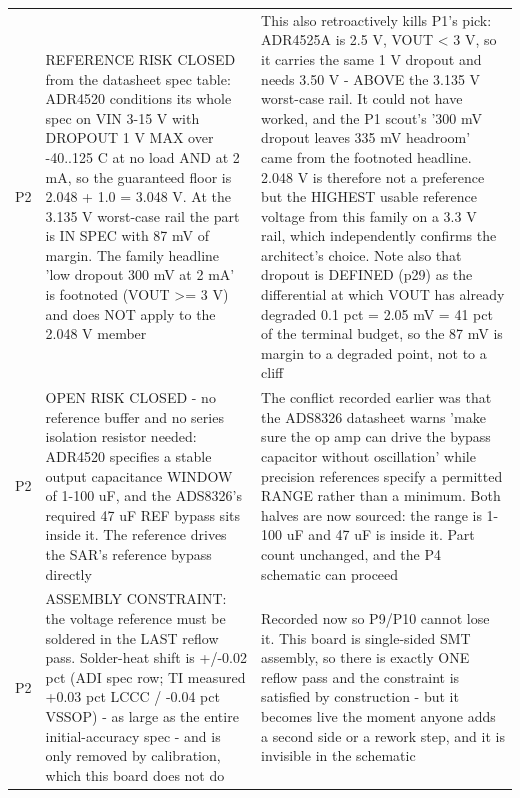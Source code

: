 \documentclass[11pt,a4paper]{article}
\begin{document}
{\begin{longtable}{lp{5.2cm}p{7.2cm}}
P2 & REFERENCE RISK CLOSED from the datasheet spec table: ADR4520 conditions its whole spec on VIN 3-15 V with DROPOUT 1 V MAX over -40..125 C at no load AND at 2 mA, so the guaranteed floor is 2.048 + 1.0 = 3.048 V. At the 3.135 V worst-case rail the part is IN SPEC with 87 mV of margin. The family headline 'low dropout 300 mV at 2 mA' is footnoted (VOUT \textgreater{}= 3 V) and does NOT apply to the 2.048 V member & This also retroactively kills P1's pick: ADR4525A is 2.5 V, VOUT \textless{} 3 V, so it carries the same 1 V dropout and needs 3.50 V - ABOVE the 3.135 V worst-case rail. It could not have worked, and the P1 scout's '300 mV dropout leaves 335 mV headroom' came from the footnoted headline. 2.048 V is therefore not a preference but the HIGHEST usable reference voltage from this family on a 3.3 V rail, which independently confirms the architect's choice. Note also that dropout is DEFINED (p29) as the differential at which VOUT has already degraded 0.1 pct = 2.05 mV = 41 pct of the terminal budget, so the 87 mV is margin to a degraded point, not to a cliff \\
P2 & OPEN RISK CLOSED - no reference buffer and no series isolation resistor needed: ADR4520 specifies a stable output capacitance WINDOW of 1-100 uF, and the ADS8326's required 47 uF REF bypass sits inside it. The reference drives the SAR's reference bypass directly & The conflict recorded earlier was that the ADS8326 datasheet warns 'make sure the op amp can drive the bypass capacitor without oscillation' while precision references specify a permitted RANGE rather than a minimum. Both halves are now sourced: the range is 1-100 uF and 47 uF is inside it. Part count unchanged, and the P4 schematic can proceed \\
P2 & ASSEMBLY CONSTRAINT: the voltage reference must be soldered in the LAST reflow pass. Solder-heat shift is +/-0.02 pct (ADI spec row; TI measured +0.03 pct LCCC / -0.04 pct VSSOP) - as large as the entire initial-accuracy spec - and is only removed by calibration, which this board does not do & Recorded now so P9/P10 cannot lose it. This board is single-sided SMT assembly, so there is exactly ONE reflow pass and the constraint is satisfied by construction - but it becomes live the moment anyone adds a second side or a rework step, and it is invisible in the schematic \\

\end{longtable}}
\end{document}
